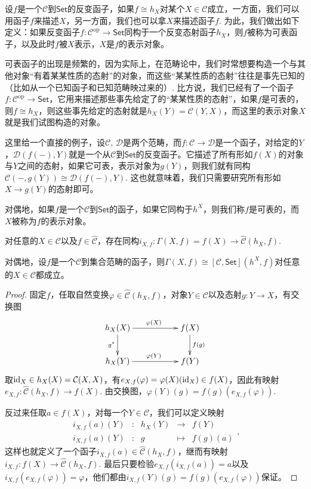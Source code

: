设$f$是一个$\mathcal{C}$到$\mathsf{Set}$的反变函子，如果$f\cong h_X$对某个$X\in \mathcal{C}$成立，一方面，我们可以用函子$f$来描述$X$，另一方面，我们也可以拿$X$来描述函子$f$. 为此，我们做出如下定义：如果反变函子$f:\mathcal{C}^{\text{op}}\to \mathsf{Set}$同构于一个反变态射函子$h_X$，则$f$被称为可表函子，以及此时$f$被$X$表示，$X$是$f$的表示对象。

可表函子的出现是频繁的，因为实际上，在范畴论中，我们时常想要构造一个与其他对象“有着某某性质的态射”的对象，而这些“某某性质的态射”往往是事先已知的（比如从一个已知函子和已知范畴映过来的）. 比方说，我们已经有了一个函子$f:\mathcal{C}^\text{op}\to\mathsf{Set}$，它用来描述那些事先给定了的“某某性质的态射”，如果$f$是可表的，则$f\cong h_X$，则这些事先给定的态射就是$h_X(Y)=\mathcal{C}(Y,X)$，而这里的表示对象$X$就是我们试图构造的对象。

这里给一个直接的例子，设$\mathcal{C}$, $\mathcal{D}$是两个范畴，而$f:\mathcal{C}\to \mathcal{D}$是一个函子，对给定的$Y$，$\mathcal{D}(f(-),Y)$就是一个从$\mathcal{C}$到$\mathsf{Set}$的反变函子。它描述了所有形如$f(X)$的对象与$Y$之间的态射，如果它可表，表示对象为$g(Y)$，则我们就有同构$\mathcal{C}(-,g(Y))\cong \mathcal{D}(f(-),Y)$. 这也就意味着，我们只需要研究所有形如$X\to g(Y)$的态射即可。

对偶地，如果$f$是一个$\mathcal{C}$到$\mathsf{Set}$的函子，如果它同构于$h^X$，则我们称$f$是可表的，而$X$被称为$f$的表示对象。

\begin{lem}
对任意的$X\in \mathcal{C}$以及$f\in \hat{\mathcal{C}}$，存在同构$i_{X,f}:\Gamma(X,f)=f(X)\to {\hat{\mathcal{C}}}(h_X,f)$.
\end{lem}

对偶地，设$f$是一个$\mathcal{C}$到集合范畴的函子，则$\Gamma(X,f)\cong [\mathcal{C},\mathsf{Set}](h^X,f)$对任意的$X\in \mathcal{C}$都成立。

\begin{proof}
	固定$f$，任取自然变换$\varphi\in {\hat{\mathcal{C}}}(h_X,f)$，对象$Y\in\mathcal{C}$以及态射$g:Y\to X$，有交换图
	\[
	\begin{xy}
		\xymatrix{
			h_X(X)\ar[rr]^{\varphi(X)} \ar[d]_{g^*}&&f(X) \ar[d]^{f(g)}\\
			h_X(Y)\ar[rr]^{\varphi(Y)}&&f(Y)
		}
	\end{xy}
	\]
	取$\operatorname{id}_X\in h_X(X)=\mathcal{C}(X,X)$，有$e_{X,f}(\varphi)=\varphi(X)(\operatorname{id}_X)\in f(X)$，因此有映射$e_{X,f}:{\hat{\mathcal{C}}}(h_X,f)\to f(X)$. 由交换图，$\varphi(Y)(g)=f(g)\left(e_{X,f}(\varphi)\right)$.

	反过来任取$a\in f(X)$，对每一个$Y\in\mathcal{C}$，我们可以定义映射
	\[
	\begin{array}{ccccc}
	i_{X,f}(a)(Y)&:&h_X(Y)&\to &f(Y)\\
	i_{X,f}(a)(Y)&:&g&\mapsto&f(g)(a)
	\end{array},
	\]
	这样也就定义了一个函子$i_{X,f}(a)\in {\hat{\mathcal{C}}}(h_X,f)$，继而有映射$i_{X,f}:f(X)\to {\hat{\mathcal{C}}}(h_X,f)$. 最后只要检验$e_{X,f}(i_{X,f}(a))=a$以及$i_{X,f}(e_{X,f}(\varphi))=\varphi$，他们都由$i_{X,f}(Y)(g)=f(g)\left(e_{X,f}(\varphi)\right)$保证。
\end{proof}

